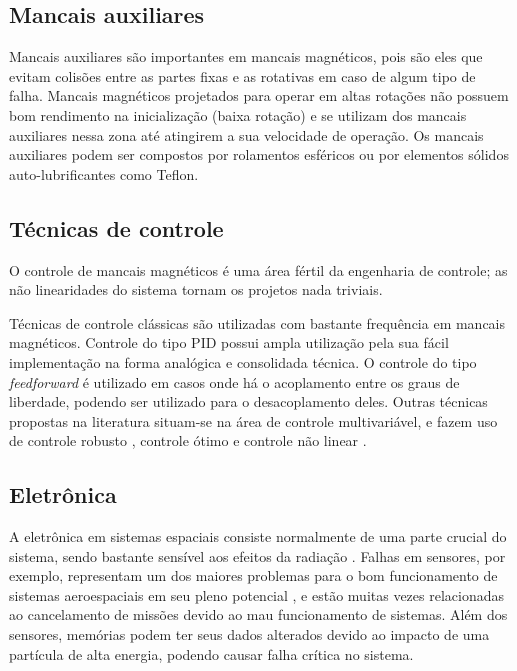 \subsection{Mancais auxiliares}

 Mancais auxiliares são importantes em mancais magnéticos, pois são eles que evitam colisões entre as partes fixas e as rotativas em caso de algum tipo de falha. Mancais magnéticos projetados para operar em altas rotações não possuem bom rendimento na inicialização  (baixa rotação) e se utilizam dos mancais auxiliares nessa zona até atingirem a sua velocidade de operação. Os mancais auxiliares podem ser compostos por rolamentos esféricos \citep{Sun2004a} ou por elementos sólidos auto-lubrificantes como Teflon.
 
\subsection{Técnicas de controle}

O controle de mancais magnéticos é uma área fértil da engenharia de controle; as não linearidades do sistema tornam os projetos nada triviais.  

Técnicas de controle clássicas são utilizadas com bastante frequência em mancais magnéticos. Controle do tipo PID \citep{Tezuka2013} possui ampla utilização pela sua fácil implementação na forma analógica e consolidada técnica. O controle  do tipo \textit{feedforward} é utilizado em casos onde há o acoplamento entre os graus de liberdade, podendo ser utilizado para o desacoplamento deles. Outras técnicas propostas na literatura situam-se na área de controle multivariável, e fazem uso de controle robusto \citep{Jimenez-Lizafrraga2007}, controle ótimo \citep{Schuhmann2012} e controle não linear \citep{Rundell1996}.

\subsection{Eletrônica}

A eletrônica em sistemas espaciais consiste normalmente de uma parte crucial do sistema, sendo bastante sensível aos efeitos da radiação \citep{Stassinopoulos1988}. Falhas em sensores, por exemplo, representam um dos maiores problemas para o bom funcionamento de sistemas aeroespaciais em seu pleno potencial \citep{Balaban2009}, e estão muitas vezes relacionadas ao cancelamento de missões devido ao mau funcionamento de sistemas. Além dos sensores, memórias podem ter seus dados alterados devido ao impacto de uma partícula de alta energia, podendo causar falha crítica no sistema.

